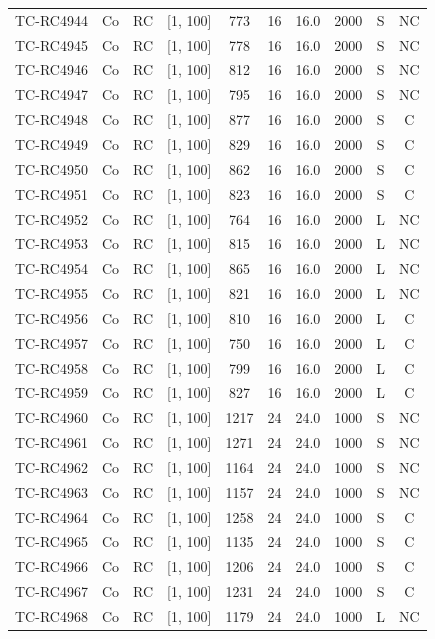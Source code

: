 \begin{longtable}{lccccccccc}
TC-RC4944 & Co & RC & [1, 100] & 773 & 16 & 16.0 & 2000 & S & NC \\
TC-RC4945 & Co & RC & [1, 100] & 778 & 16 & 16.0 & 2000 & S & NC \\
TC-RC4946 & Co & RC & [1, 100] & 812 & 16 & 16.0 & 2000 & S & NC \\
TC-RC4947 & Co & RC & [1, 100] & 795 & 16 & 16.0 & 2000 & S & NC \\
TC-RC4948 & Co & RC & [1, 100] & 877 & 16 & 16.0 & 2000 & S & C \\
TC-RC4949 & Co & RC & [1, 100] & 829 & 16 & 16.0 & 2000 & S & C \\
TC-RC4950 & Co & RC & [1, 100] & 862 & 16 & 16.0 & 2000 & S & C \\
TC-RC4951 & Co & RC & [1, 100] & 823 & 16 & 16.0 & 2000 & S & C \\
TC-RC4952 & Co & RC & [1, 100] & 764 & 16 & 16.0 & 2000 & L & NC \\
TC-RC4953 & Co & RC & [1, 100] & 815 & 16 & 16.0 & 2000 & L & NC \\
TC-RC4954 & Co & RC & [1, 100] & 865 & 16 & 16.0 & 2000 & L & NC \\
TC-RC4955 & Co & RC & [1, 100] & 821 & 16 & 16.0 & 2000 & L & NC \\
TC-RC4956 & Co & RC & [1, 100] & 810 & 16 & 16.0 & 2000 & L & C \\
TC-RC4957 & Co & RC & [1, 100] & 750 & 16 & 16.0 & 2000 & L & C \\
TC-RC4958 & Co & RC & [1, 100] & 799 & 16 & 16.0 & 2000 & L & C \\
TC-RC4959 & Co & RC & [1, 100] & 827 & 16 & 16.0 & 2000 & L & C \\
TC-RC4960 & Co & RC & [1, 100] & 1217 & 24 & 24.0 & 1000 & S & NC \\
TC-RC4961 & Co & RC & [1, 100] & 1271 & 24 & 24.0 & 1000 & S & NC \\
TC-RC4962 & Co & RC & [1, 100] & 1164 & 24 & 24.0 & 1000 & S & NC \\
TC-RC4963 & Co & RC & [1, 100] & 1157 & 24 & 24.0 & 1000 & S & NC \\
TC-RC4964 & Co & RC & [1, 100] & 1258 & 24 & 24.0 & 1000 & S & C \\
TC-RC4965 & Co & RC & [1, 100] & 1135 & 24 & 24.0 & 1000 & S & C \\
TC-RC4966 & Co & RC & [1, 100] & 1206 & 24 & 24.0 & 1000 & S & C \\
TC-RC4967 & Co & RC & [1, 100] & 1231 & 24 & 24.0 & 1000 & S & C \\
TC-RC4968 & Co & RC & [1, 100] & 1179 & 24 & 24.0 & 1000 & L & NC \\

\end{longtable}
